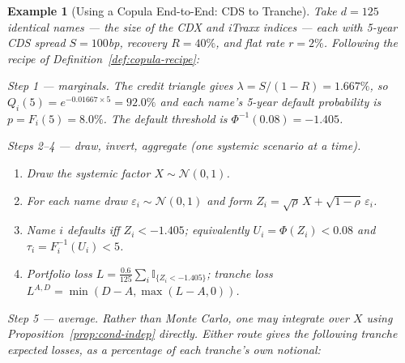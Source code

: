 \documentclass{report}
\theoremstyle{spacedplain}
\theoremstyle{spaceddefinition}
\newtheorem{example}[theorem]{Example}
\theoremstyle{spacedremark}
\begin{document}
\begin{example}[Using a Copula End-to-End: CDS to Tranche]\label{ex:copula-e2e}
Take $d = 125$ identical names --- the size of the CDX and iTraxx indices --- each with 5-year CDS spread $S = 100$bp, recovery $R = 40\%$, and flat rate $r = 2\%$. Following the recipe of Definition~\ref{def:copula-recipe}:

\emph{Step 1 --- marginals.} The credit triangle gives $\lambda = S/(1-R) = 1.667\%$, so $Q_i(5) = e^{-0.01667\times 5} = 92.0\%$ and each name's 5-year default probability is $p = F_i(5) = 8.0\%$. The default threshold is $\Phi^{-1}(0.08) = -1.405$.

\emph{Steps 2--4 --- draw, invert, aggregate (one systemic scenario at a time).}
\begin{enumerate}
    \item Draw the systemic factor $X \sim \mathcal{N}(0,1)$.
    \item For each name draw $\varepsilon_i \sim \mathcal{N}(0,1)$ and form $Z_i = \sqrt{\rho}\,X + \sqrt{1-\rho}\,\varepsilon_i$.
    \item Name $i$ defaults iff $Z_i < -1.405$; equivalently $U_i = \Phi(Z_i) < 0.08$ and $\tau_i = F_i^{-1}(U_i) < 5$.
    \item Portfolio loss $L = \frac{0.6}{125}\sum_i \mathbb{I}_{\{Z_i < -1.405\}}$; tranche loss $L^{A,D} = \min(D-A, \max(L-A,0))$.
\end{enumerate}

\emph{Step 5 --- average.} Rather than Monte Carlo, one may integrate over $X$ using Proposition~\ref{prop:cond-indep} directly. Either route gives the following tranche expected losses, as a percentage of each tranche's own notional:


\end{example}
\end{document}
